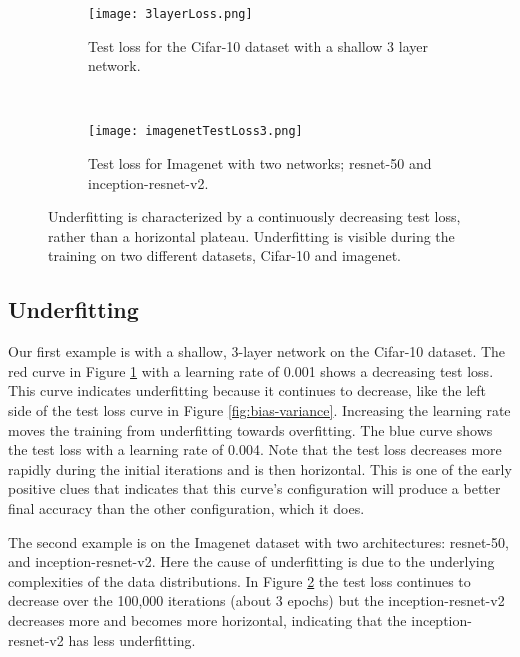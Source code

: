 \documentclass{article} %
\begin{document}
\begin{figure}[tbh]
	\centering
	\begin{subfigure}[b]{0.4\textwidth}
		\texttt{[image: 3layerLoss.png]}
		\caption{Test loss for the Cifar-10 dataset with a shallow 3 layer network. }
		\label{fig:3layerLoss}       %
	\end{subfigure}
	\quad
	\hfill
	~ %
	\centering
	\begin{subfigure}[b]{0.52\textwidth}
		\texttt{[image: imagenetTestLoss3.png]}
		\caption{Test loss for Imagenet with two networks; resnet-50 and inception-resnet-v2.}
		\label{fig:imagenetTestLoss3}       %
	\end{subfigure}
	\caption{Underfitting is characterized by a continuously decreasing test loss, rather than a horizontal plateau. Underfitting is  visible during the training on two different datasets, Cifar-10 and imagenet.}
	\label{fig:Loss1}
	\vspace{-5pt}	
\end{figure}

\subsection{Underfitting}
\label{sec:underfitting}

Our first example is with a shallow, 3-layer network on the Cifar-10 dataset.  The red curve in Figure \ref{fig:3layerLoss} with a learning rate of 0.001 shows a decreasing test loss.  This  curve indicates underfitting because it continues to decrease, like the left side of the test loss curve in Figure \ref{fig:bias-variance}. Increasing the learning rate moves the training from underfitting towards overfitting.  The blue curve shows the test loss with a learning rate of 0.004.  Note that the test loss decreases more rapidly during the initial iterations and is then horizontal.  This is one of the early positive clues that indicates that this curve's configuration will produce a better final accuracy than the other configuration, which it does.  

The second example is on the Imagenet dataset with two architectures: resnet-50, and inception-resnet-v2.  Here the cause of underfitting is due to the underlying complexities of the data distributions.  In Figure \ref{fig:imagenetTestLoss3} the test loss continues to decrease over the 100,000 iterations (about 3 epochs) but the inception-resnet-v2 decreases more and becomes more horizontal, indicating that the inception-resnet-v2 has less underfitting.
\end{document}
